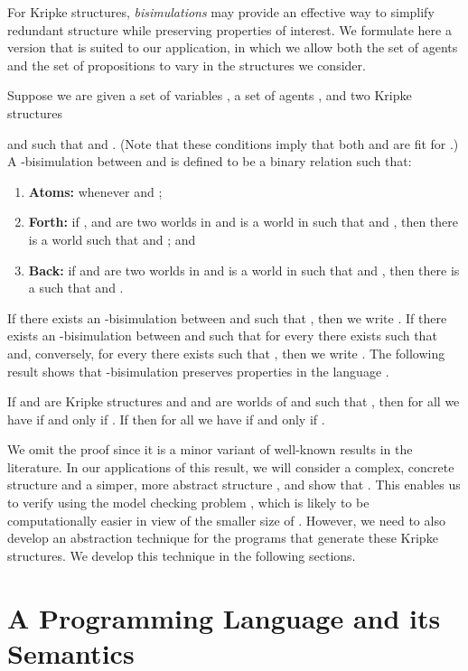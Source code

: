 \documentclass[]{llncs}
\begin{document}
For Kripke structures, {\em bisimulations}
may provide an 
effective way to simplify redundant structure 
while preserving properties of interest. We formulate here a 
version that is suited to our application, in which we allow both the 
set of agents and the set of propositions to vary  in the structures 
we consider. 

Suppose we are given a set of variables , a set of agents , 
and two Kripke structures 
  
and   
such that  and . 
(Note that these conditions imply that both  and  are fit for .) 
A -bisimulation  between  and  is defined to be a binary relation
 such that:
\begin{enumerate}
\item \textbf{Atoms:}  whenever  and ; 

\item  \textbf{Forth:}  if ,  and  are two worlds in  and  is a world in 
such that  and , then there is
a world   such that 
and ; and 
\item \textbf{Back:}  if   and  are two worlds in  and  is a world in 
such that  and , then there is
a  such that 
and .

\end{enumerate}
If there exists an -bisimulation  between  and  such that ,
then we write . 
If there  exists an -bisimulation  between  and  such that 
for every  there exists  such that  and, conversely, 
for every  there exists  such that ,  then we write . 
The following result shows that -bisimulation preserves properties in the language . 

\begin{lemma}
If  and  are Kripke structures and  and  are worlds of 
 and  such that
 , then 
 for all  we have 
 if and only if . 
If  then for all  we have 
 if and only if .
\end{lemma}
 
We omit the proof since it is a minor variant of well-known results 
in the literature.  
In our applications of this result, 
we will consider a complex, concrete structure  
and a simper, more abstract structure , and show that 
. This enables us to verify 
 using the model checking problem
, which is likely to be computationally 
easier in view of the smaller size of . However, we need 
to also develop an abstraction technique for the programs that 
generate these Kripke structures. We develop this technique in the following sections. 

\section{A Programming Language and its Semantics} \label{sec:programs} 
\end{document}
